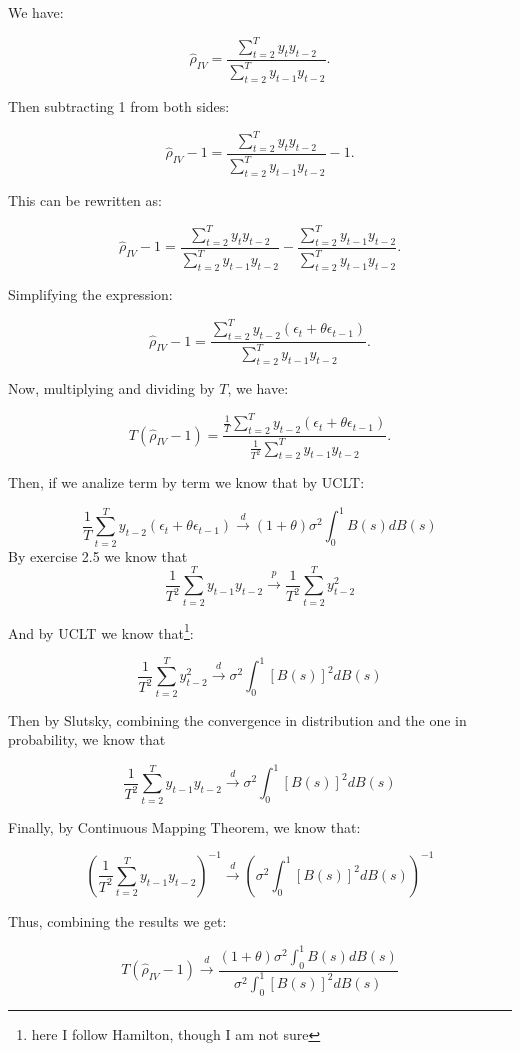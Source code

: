\documentclass{article}
\begin{document}
We have:

\[
\hat{\rho}_{IV}= \frac{\sum_{t=2}^{T} y_{t}y_{t-2}}{\sum_{t=2}^{T} y_{t-1}y_{t-2}}.
\]

Then subtracting 1 from both sides:

\[
\hat{\rho}_{IV}-1= \frac{\sum_{t=2}^{T} y_{t}y_{t-2}}{\sum_{t=2}^{T} y_{t-1}y_{t-2}}-1.
\]

This can be rewritten as:

\[
\hat{\rho}_{IV}-1= \frac{\sum_{t=2}^{T} y_{t}y_{t-2}}{\sum_{t=2}^{T} y_{t-1}y_{t-2}}-\frac{\sum_{t=2}^{T} y_{t-1}y_{t-2}}{\sum_{t=2}^{T} y_{t-1}y_{t-2}}.
\]

Simplifying the expression:

\[
\hat{\rho}_{IV}-1= \frac{\sum_{t=2}^{T} y_{t-2}(\epsilon_{t}+\theta \epsilon_{t-1})}{\sum_{t=2}^{T} y_{t-1}y_{t-2}}.
\]

Now, multiplying and dividing by \(T\), we have:

\[
T(\hat{\rho}_{IV}-1) = \frac{\frac{1}{T} \sum_{t=2}^{T} y_{t-2}(\epsilon_{t}+\theta \epsilon_{t-1})}{\frac{1}{T^2} \sum_{t=2}^{T} y_{t-1}y_{t-2}}.
\]


Then, if we analize term by term we know that by UCLT:

\[
\frac{1}{T}\sum_{t=2}^{T}y_{t-2}(\epsilon_{t}+\theta \epsilon_{t-1})\overset{d}{\to}(1+\theta)\sigma^{2}\int_0^1B(s)dB(s)
\]
By exercise 2.5 we know that 
\[
\frac{1}{T^2} \sum_{t=2}^T y_{t-1} y_{t-2} \overset{p}{\to} \frac{1}{T^2} \sum_{t=2}^T y_{t-2}^2 
\]


And by UCLT we know that\footnote{here I follow Hamilton, though I am not sure}:

\[
  \frac{1}{T^2} \sum_{t=2}^T y_{t-2}^2 \overset{d}{\to} \sigma^{2}\int_0^1[B(s)]^{2}dB(s)
\]

Then by Slutsky, combining the convergence in distribution and the one in probability, we know that 


\[
\frac{1}{T^{2}}\sum_{t=2}^{T}y_{t-1} y_{t-2}\overset{d}{\to}\sigma^{2}\int_0^1[B(s)]^{2}dB(s)
\]

Finally, by Continuous Mapping Theorem, we know that: 

\[
(\frac{1}{T^{2}}\sum_{t=2}^{T}y_{t-1}y_{t-2})^{-1}\overset{d}{\to}(\sigma^{2}\int_0^1[B(s)]^{2}dB(s))^{-1}
\]

Thus, combining the results we get:

\[
  T(\hat{\rho}_{IV}-1)\overset{d}{\to} \frac{(1+\theta)\sigma^{2}\int_0^1B(s)dB(s)}{\sigma^{2}\int_0^1[B(s)]^{2}dB(s)}
\]
\end{document}
